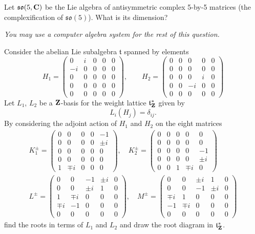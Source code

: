 \documentclass[12pt]{article}
\begin{document}
\begin{question}
Let $\mathfrak{so}(5,\mathbf{C})$ be the Lie algebra of antisymmetric complex 5-by-5 matrices (the complexification of $\mathfrak{so}(5)$). What is its dimension?

{\em You may use a computer algebra system for the rest of this question.}

Consider the abelian Lie subalgebra $\mathfrak{t}$ spanned by elements
\[H_1=\left(\begin{array}{ccccc}
0 & i& 0 & 0 & 0\\
-i & 0 & 0 & 0 & 0\\
0 & 0 & 0 & 0 & 0\\
0 & 0 & 0 & 0 & 0\\
0 & 0 & 0 & 0 & 0
\end{array}\right),\qquad H_2=\left(\begin{array}{ccccc}
0 & 0& 0 & 0 & 0\\
0 & 0 & 0 & 0 & 0\\
0 & 0 & 0 & i & 0\\
0 & 0 & -i & 0 & 0\\
0 & 0 & 0 & 0 & 0
\end{array}\right)\]
Let $L_1$, $L_2$ be a $\mathbf{Z}$-basis for the weight lattice $\mathfrak{t}^*_{\mathbf{Z}}$ given by
\[L_i(H_j)=\delta_{ij}.\]
By considering the adjoint action of $H_1$ and $H_2$ on the eight matrices
\begin{gather*}
K_1^{\pm}=\left(\begin{array}{ccccc}
0 & 0& 0 & 0 & -1\\
0 & 0 & 0 & 0 & \pm i\\
0 & 0 & 0 & 0 & 0\\
0 & 0 & 0 & 0 & 0\\
1 & \mp i & 0 & 0 & 0
\end{array}\right),\quad
K_2^{\pm}=\left(\begin{array}{ccccc}
0 & 0& 0 & 0 & 0\\
0 & 0 & 0 & 0 & 0\\
0 & 0 & 0 & 0 & -1\\
0 & 0 & 0 & 0 & \pm i\\
0 & 0 & 1 & \mp i & 0
\end{array}\right)\\
L^{\pm}=\left(\begin{array}{ccccc}
0 & 0& -1 & \pm i & 0\\
0 & 0 & \pm i & 1 & 0\\
1 & \mp i & 0 & 0 & 0\\
\mp i & -1 & 0 & 0 & 0\\
0 & 0 & 0 & 0 & 0
\end{array}\right),\quad
M^{\pm}=\left(\begin{array}{ccccc}
0 & 0& \pm i & 1 & 0\\
0 & 0 & -1 & \pm i & 0\\
\mp i & 1 & 0 & 0 & 0\\
-1 & \mp i & 0 & 0 & 0\\
0 & 0 & 0 & 0 & 0
\end{array}\right)\end{gather*}
find the roots in terms of $L_1$ and $L_2$ and draw the root diagram in $\mathfrak{t}^*_{\mathbf{Z}}$.


\end{question}
\end{document}

